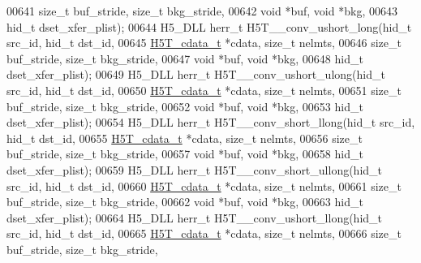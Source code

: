 \begin{DoxyCode}
00641                     \textcolor{keywordtype}{size\_t} buf\_stride, \textcolor{keywordtype}{size\_t} bkg\_stride,
00642                                     \textcolor{keywordtype}{void} *buf, \textcolor{keywordtype}{void} *bkg,
00643                                     hid\_t dset\_xfer\_plist);
00644 H5\_DLL herr\_t H5T\_\_conv\_ushort\_long(hid\_t src\_id, hid\_t dst\_id,
00645                     \hyperlink{struct_h5_t__cdata__t}{H5T\_cdata\_t} *cdata, \textcolor{keywordtype}{size\_t} nelmts,
00646                     \textcolor{keywordtype}{size\_t} buf\_stride, \textcolor{keywordtype}{size\_t} bkg\_stride,
00647                                     \textcolor{keywordtype}{void} *buf, \textcolor{keywordtype}{void} *bkg,
00648                                     hid\_t dset\_xfer\_plist);
00649 H5\_DLL herr\_t H5T\_\_conv\_ushort\_ulong(hid\_t src\_id, hid\_t dst\_id,
00650                      \hyperlink{struct_h5_t__cdata__t}{H5T\_cdata\_t} *cdata, \textcolor{keywordtype}{size\_t} nelmts,
00651                      \textcolor{keywordtype}{size\_t} buf\_stride, \textcolor{keywordtype}{size\_t} bkg\_stride,
00652                                      \textcolor{keywordtype}{void} *buf, \textcolor{keywordtype}{void} *bkg,
00653                                      hid\_t dset\_xfer\_plist);
00654 H5\_DLL herr\_t H5T\_\_conv\_short\_llong(hid\_t src\_id, hid\_t dst\_id,
00655                     \hyperlink{struct_h5_t__cdata__t}{H5T\_cdata\_t} *cdata, \textcolor{keywordtype}{size\_t} nelmts,
00656                     \textcolor{keywordtype}{size\_t} buf\_stride, \textcolor{keywordtype}{size\_t} bkg\_stride,
00657                                     \textcolor{keywordtype}{void} *buf, \textcolor{keywordtype}{void} *bkg,
00658                                     hid\_t dset\_xfer\_plist);
00659 H5\_DLL herr\_t H5T\_\_conv\_short\_ullong(hid\_t src\_id, hid\_t dst\_id,
00660                      \hyperlink{struct_h5_t__cdata__t}{H5T\_cdata\_t} *cdata, \textcolor{keywordtype}{size\_t} nelmts,
00661                      \textcolor{keywordtype}{size\_t} buf\_stride, \textcolor{keywordtype}{size\_t} bkg\_stride,
00662                                      \textcolor{keywordtype}{void} *buf, \textcolor{keywordtype}{void} *bkg,
00663                                      hid\_t dset\_xfer\_plist);
00664 H5\_DLL herr\_t H5T\_\_conv\_ushort\_llong(hid\_t src\_id, hid\_t dst\_id,
00665                      \hyperlink{struct_h5_t__cdata__t}{H5T\_cdata\_t} *cdata, \textcolor{keywordtype}{size\_t} nelmts,
00666                      \textcolor{keywordtype}{size\_t} buf\_stride, \textcolor{keywordtype}{size\_t} bkg\_stride,

\end{DoxyCode}
